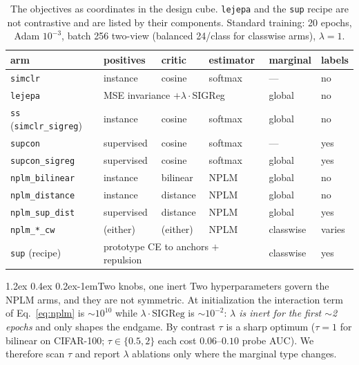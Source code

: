 \documentclass{article}
\makeatletter
\renewcommand\paragraph{\@startsection{paragraph}{4}{\z@}%
  {1.2ex \@plus 0.4ex \@minus 0.2ex}{-1em}{\normalsize\bf}}
\makeatother
\begin{document}
\begin{table}[t]\centering\small
\begin{tabular}{llllll}
\toprule
arm & positives & critic & estimator & marginal & labels \\
\midrule
\texttt{simclr}          & instance    & cosine   & softmax & ---       & no \\
\texttt{lejepa}          & \multicolumn{3}{l}{MSE invariance $+\lambda\cdot$SIGReg} & global & no \\
\texttt{ss} (\texttt{simclr\_sigreg}) & instance & cosine & softmax & global & no \\
\texttt{supcon}          & supervised  & cosine   & softmax & ---       & yes \\
\texttt{supcon\_sigreg}  & supervised  & cosine   & softmax & global    & yes \\
\texttt{nplm\_bilinear}  & instance    & bilinear & NPLM    & global    & no \\
\texttt{nplm\_distance}  & instance    & distance & NPLM    & global    & no \\
\texttt{nplm\_sup\_dist} & supervised  & distance & NPLM    & global    & yes \\
\texttt{nplm\_*\_cw}     & (either)    & (either) & NPLM    & classwise & varies \\
\texttt{sup} (recipe)    & \multicolumn{3}{l}{prototype CE to anchors $+$ repulsion} & classwise & yes \\
\bottomrule
\end{tabular}
\caption{The objectives as coordinates in the design cube. \texttt{lejepa} and
the \texttt{sup} recipe are not contrastive and are listed by their components.
Standard training: 20 epochs, Adam $10^{-3}$, batch 256 two-view (balanced
24/class for classwise arms), $\lambda=1$.}
\label{tab:arms}
\end{table}

\paragraph{Two knobs, one inert}
Two hyperparameters govern the NPLM arms, and they are not symmetric. At
initialization the interaction term of Eq.~\ref{eq:nplm} is $\sim\!10^{10}$
while $\lambda\cdot\mathrm{SIGReg}$ is $\sim\!10^{-2}$: \emph{$\lambda$ is
inert for the first $\sim$2 epochs} and only shapes the endgame. By contrast
$\tau$ is a sharp optimum ($\tau=1$ for bilinear on CIFAR-100; $\tau\in
\{0.5,2\}$ each cost $0.06$--$0.10$ probe AUC). We therefore scan $\tau$ and
report $\lambda$ ablations only where the marginal type changes.
\end{document}
